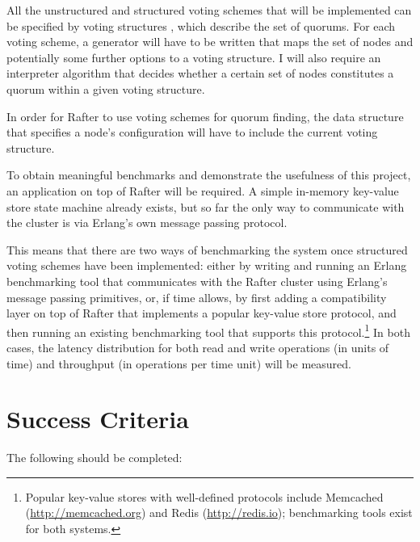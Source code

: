 \documentclass[12pt,chapterprefix=true,toc=bibliography,numbers=noendperiod,
               footnotes=multiple,twoside]{scrreprt}
\begin{document}
All the unstructured and structured voting schemes that will be implemented can be specified by voting structures \autocite{voting}, which describe the set of quorums. For each voting scheme, a generator will have to be written that maps the set of nodes and potentially some further options to a voting structure. I will also require an interpreter algorithm that decides whether a certain set of nodes constitutes a quorum within a given voting structure.

In order for Rafter to use voting schemes for quorum finding, the data structure that specifies a node's configuration will have to include the current voting structure.

To obtain meaningful benchmarks and demonstrate the usefulness of this project, an application on top of Rafter will be required. A simple in-memory key-value store state machine already exists, but so far the only way to communicate with the cluster is via Erlang's own message passing protocol.

This means that there are two ways of benchmarking the system once structured voting schemes have been implemented: either by writing and running an Erlang benchmarking tool that communicates with the Rafter cluster using Erlang's message passing primitives, or, if time allows, by first adding a compatibility layer on top of Rafter that implements a popular key-value store protocol, and then running an existing benchmarking tool that supports this protocol.\footnote{Popular key-value stores with well-defined protocols include Memcached (\url{http://memcached.org}) and Redis (\url{http://redis.io}); benchmarking tools exist for both systems.} In both cases, the latency distribution for both read and write operations (in units of time) and throughput (in operations per time unit) will be measured.

\section*{Success Criteria%
  \label{success-criteria}%
}

The following should be completed:
\end{document}
